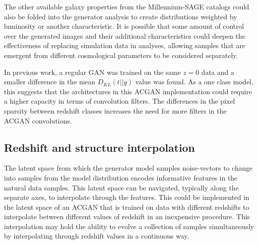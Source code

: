 \documentclass[twocolumn]{article}
\numberwithin{equation}{section}
\begin{document}
The other available galaxy properties from the Millennium-SAGE catalogs could also be folded into the generator analysis
to create distributions weighted by luminosity or another characteristic. It is possible that some amount of control over
the generated images and their additional characteristics could deepen the effectiveness of replacing simulation data in 
analyses, allowing samples that are emergent from different cosmological parameters to be considered separately.

In previous work, a regular GAN was trained on the same $z=0$ data and a smaller difference in the mean $D_{KL}(t||g)$ value
was found. As a one class model, this suggests that the architectures in this ACGAN implementation could require a higher 
capacity in terms of convolution filters. The differences in the pixel sparsity between redshift classes increases the need
for more filters in the ACGAN convolutions.


\subsection{Redshift and structure interpolation} 
The latent space from which the generator model samples noise-vectors to change into samples from the model distribution 
encodes informative features in the natural data samples. This latent space can be navigated, typically along the separate 
axes, to interpolate through the features. This could be implemented in the latent space of an ACGAN that is trained on 
data with different redshifts to interpolate between different values of redshift in an inexpensive procedure. This 
interpolation may hold the ability to evolve a collection of samples simultaneously by interpolating through redshift 
values in a continuous way. 

\end{document}
